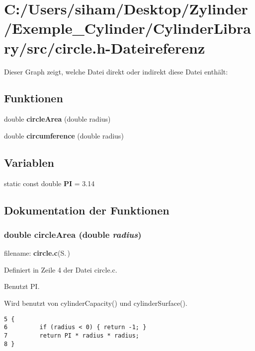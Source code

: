 \section{C:/Users/siham/Desktop/Zylinder/Exemple\_\-Cylinder/Cylinder\-Library/src/circle.h-Dateireferenz}
\label{circle_8h}


Dieser Graph zeigt, welche Datei direkt oder indirekt diese Datei enth\"{a}lt:\subsection*{Funktionen}
\begin{CompactItemize}
\item 
double {\bf circle\-Area} (double radius)
\item 
double {\bf circumference} (double radius)
\end{CompactItemize}
\subsection*{Variablen}
\begin{CompactItemize}
\item 
static const double {\bf PI} = 3.14
\end{CompactItemize}


\subsection{Dokumentation der Funktionen}
\subsubsection{\setlength{\rightskip}{0pt plus 5cm}double circle\-Area (double {\em radius})}\label{circle_8h_ef6c48edf38069b2b3684a790d806b92}


filename: {\bf circle.c}{\rm (S.\,\pageref{circle_8c})} 

Definiert in Zeile 4 der Datei circle.c.

Benutzt PI.

Wird benutzt von cylinder\-Capacity() und cylinder\-Surface().

\footnotesize\begin{verbatim}5 {
6         if (radius < 0) { return -1; }
7         return PI * radius * radius;
8 }
\end{verbatim}\normalsize 


